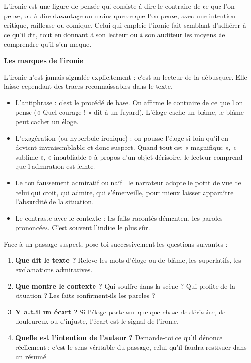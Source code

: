 \documentclass[11pt]{article}
\newcommand{\cle}[1]{{\popxbold\color{popdark}#1}}
\begin{document}
\begin{definition}[L'ironie]
L'\cle{ironie} est une figure de pensée qui consiste à dire le contraire de ce que l'on pense, ou à dire davantage ou moins que ce que l'on pense, avec une intention critique, railleuse ou comique. Celui qui emploie l'ironie fait semblant d'adhérer à ce qu'il dit, tout en donnant à son lecteur ou à son auditeur les moyens de comprendre qu'il s'en moque.
\end{definition}

\textbf{Les marques de l'ironie}

L'ironie n'est jamais signalée explicitement : c'est au lecteur de la débusquer. Elle laisse cependant des traces reconnaissables dans le texte.

\begin{itemize}
\item L'\cle{antiphrase} : c'est le procédé de base. On affirme le contraire de ce que l'on pense (« Quel courage ! » dit à un fuyard). L'éloge cache un blâme, le blâme peut cacher un éloge.
\item L'\cle{exagération} (ou hyperbole ironique) : on pousse l'éloge si loin qu'il en devient invraisemblable et donc suspect. Quand tout est « magnifique », « sublime », « inoubliable » à propos d'un objet dérisoire, le lecteur comprend que l'admiration est feinte.
\item Le \cle{ton faussement admiratif} ou naïf : le narrateur adopte le point de vue de celui qui croit, qui admire, qui s'émerveille, pour mieux laisser apparaître l'absurdité de la situation.
\item Le \cle{contraste avec le contexte} : les faits racontés démentent les paroles prononcées. C'est souvent l'indice le plus sûr.
\end{itemize}

\begin{methode}
Face à un passage suspect, pose-toi successivement les questions suivantes :
\begin{enumerate}
\item \textbf{Que dit le texte ?} Releve les mots d'éloge ou de blâme, les superlatifs, les exclamations admiratives.
\item \textbf{Que montre le contexte ?} Qui souffre dans la scène ? Qui profite de la situation ? Les faits confirment-ils les paroles ?
\item \textbf{Y a-t-il un écart ?} Si l'éloge porte sur quelque chose de dérisoire, de douloureux ou d'injuste, l'écart est le signal de l'ironie.
\item \textbf{Quelle est l'intention de l'auteur ?} Demande-toi ce qu'il dénonce réellement : c'est le sens véritable du passage, celui qu'il faudra restituer dans un résumé.
\end{enumerate}
\end{methode}
\end{document}
